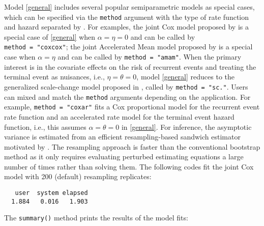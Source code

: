 Model \ref{general} includes several popular semiparametric models as
special cases, which can be specified via the \texttt{method} argument
with the type of rate function and hazard separated by
\texttt{\textbar{}}. For examples, the joint Cox model proposed by
\citet{huang2004joint} is a special case of \ref{general} when
\(\alpha = \eta = 0\) and can be called by
\texttt{method\ =\ "cox\textbar{}cox"}; the joint Accelerated Mean model
proposed by \citet{xu2017joint} is a special case when \(\alpha = \eta\)
and can be called by \texttt{method\ =\ "am\textbar{}am"}. When the
primary interest is in the covariate effects on the risk of recurrent
events and treating the terminal event as nuisances, i.e.,
\(\eta = \theta = 0\), model \ref{general} reduces to the generalized
scale-change model proposed in \citet{xu2019generalized}, called by
\texttt{method\ =\ "sc\textbar{}."}. Users can mixed and match the
\texttt{method} arguments depending on the application. For example,
\texttt{method\ =\ "cox\textbar{}ar"} fits a Cox proportional model for
the recurrent event rate function and an accelerated rate model for the
terminal event hazard function, i.e., this assumes
\(\alpha = \theta = 0\) in \ref{general}. For inference, the asymptotic
variance is estimated from an efficient resampling-based sandwich
estimator motivated by \citet{zeng2008efficient}. The resampling
approach is faster than the conventional bootstrap method as it only
requires evaluating perturbed estimating equations a large number of
times rather than solving them. The following codes fit the joint Cox
model with 200 (default) resampling replicates:

\begin{Shaded}
\begin{Highlighting}[]
\StringTok{ } \NormalTok{))}
\end{Highlighting}
\end{Shaded}

\begin{verbatim}
   user  system elapsed 
  1.884   0.016   1.903 
\end{verbatim}

The \texttt{summary()} method prints the results of the model fits:

\begin{Shaded}
\begin{Highlighting}[]
\end{Highlighting}
\end{Shaded}

